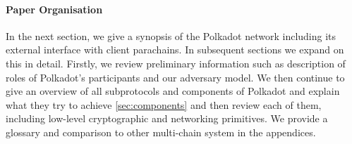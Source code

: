 \paragraph{Paper Organisation} In the next section, we give a synopsis of the Polkadot network including its external interface with client parachains. In subsequent sections we expand on this in detail. Firstly, we review preliminary information such as description of roles of Polkadot's participants and our adversary model. We then continue to give an overview of all subprotocols and components of Polkadot and explain what they try to achieve \ref{sec:components} and then review each of them, including low-level cryptographic and networking primitives. We provide a glossary and comparison to other multi-chain system in the appendices.






